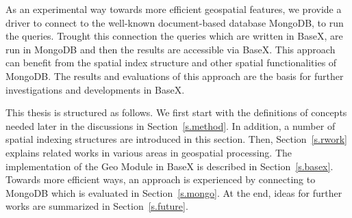 \documentclass[a4paper,12pt]{article}
\begin{document}
As an experimental way towards more efficient geospatial features, 
we provide a driver to connect to the well-known document-based database MongoDB, to run the queries. Trought this connection the queries which are written in BaseX, are run in MongoDB and then the results are accessible via BaseX. This approach can benefit from the spatial index structure and other spatial functionalities of MongoDB. The results and evaluations of this approach are the basis for further investigations and developments in BaseX. 


This thesis is structured as follows. We first start with the definitions of concepts needed later in the discussions
in Section~\ref{s.method}. In addition, a number of spatial indexing structures are introduced in this section. 
Then, Section~\ref{s.rwork} explains related works in various areas in geospatial processing. The implementation of the Geo Module in BaseX is described in Section~\ref{s.basex}. 
Towards more efficient ways, an approach is experienced by connecting to MongoDB which is evaluated in Section~\ref{s.mongo}.
At the end, ideas for further works are summarized in
Section~\ref{s.future}.
\end{document}
